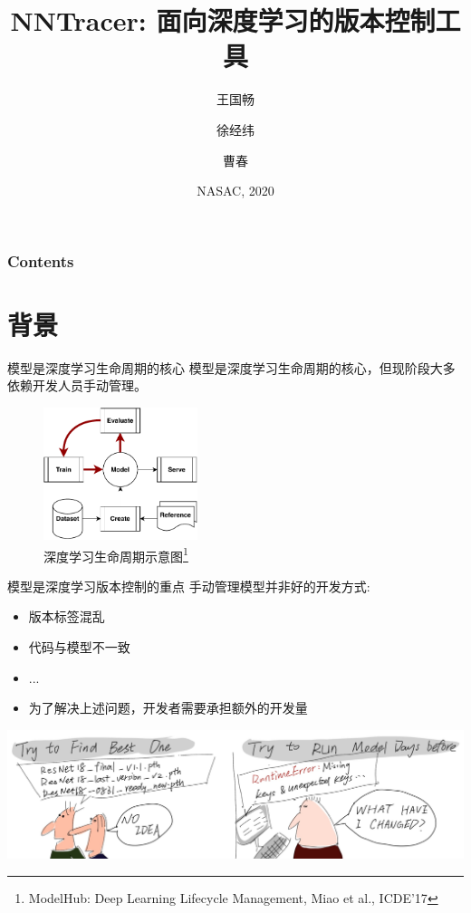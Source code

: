 \documentclass{beamer}
\title[NNTracer] %
{NNTracer: 面向深度学习的版本控制工具}
\author[Wang, Xu, Cao] %
{王国畅 \and 徐经纬 \and 曹春}
\institute[NJU] %
{
  软件新技术国家重点实验室\\
  南京大学
}
\date[NASAC 2020] %
{NASAC, 2020}
\begin{document}
\frame{\titlepage}


\begin{frame}
\frametitle{Contents}
\tableofcontents
\end{frame}


\section{背景}

\begin{frame}{模型是深度学习生命周期的核心}
模型是深度学习生命周期的核心，但现阶段大多依赖开发人员手动管理。
\begin{figure}
    \centering
    \includegraphics[width=0.4\textwidth]{lifecycle.pdf}
    \caption{深度学习生命周期示意图\footnote{ModelHub: Deep Learning Lifecycle Management, Miao et al., ICDE'17}}
    \label{fig:1}
\end{figure}
\end{frame}

\begin{frame}{模型是深度学习版本控制的重点}
手动管理模型并非好的开发方式:
\begin{itemize}
    \item 版本标签混乱
    \item 代码与模型不一致
    \item ...
    \item 为了解决上述问题，开发者需要承担额外的开发量
\end{itemize}
\begin{center}
  \includegraphics[height=0.3\textheight]{versioncontrol.png}
\end{center}
\end{frame}
\end{document}
